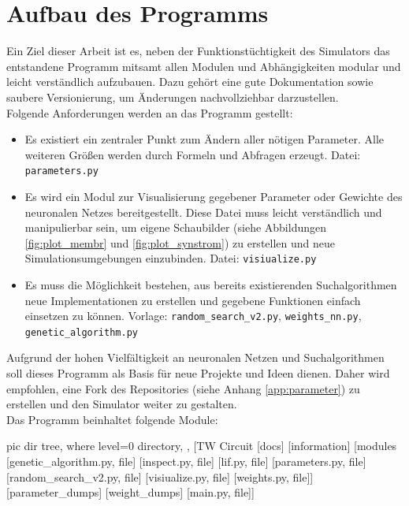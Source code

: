 \section{Aufbau des Programms}
\label{sec:imp_module}
	Ein Ziel dieser Arbeit ist es, neben der Funktionstüchtigkeit des Simulators das entstandene Programm mitsamt allen Modulen und Abhängigkeiten modular und leicht verständlich aufzubauen. Dazu gehört eine gute Dokumentation sowie saubere Versionierung, um Änderungen nachvollziehbar darzustellen.\\
	Folgende Anforderungen werden an das Programm gestellt:
	\begin{itemize}
		\item Es existiert ein zentraler Punkt zum Ändern aller nötigen Parameter. Alle weiteren Größen werden durch Formeln und Abfragen erzeugt.
		\subitem Datei: \texttt{parameters.py}
		\item Es wird ein Modul zur Visualisierung gegebener Parameter oder Gewichte des neuronalen Netzes bereitgestellt. Diese Datei muss leicht verständlich und manipulierbar sein, um eigene Schaubilder (siehe Abbildungen \ref{fig:plot_membr} und \ref{fig:plot_synstrom}) zu erstellen und neue Simulationsumgebungen einzubinden.
		\subitem Datei: \texttt{visiualize.py}
		\item Es muss die Möglichkeit bestehen, aus bereits existierenden Suchalgorithmen neue Implementationen zu erstellen und gegebene Funktionen einfach einsetzen zu können.
		\subitem Vorlage: \texttt{random\_search\_v2.py}, \texttt{weights\_nn.py}, \texttt{genetic\_algorithm.py}
	\end{itemize}
	Aufgrund der hohen Vielfältigkeit an neuronalen Netzen und Suchalgorithmen soll dieses Programm als Basis für neue Projekte und Ideen dienen. Daher wird empfohlen, eine Fork des Repositories (siehe Anhang \ref{app:parameter}) zu erstellen und den Simulator weiter zu gestalten.\\
	Das Programm beinhaltet folgende Module:\\
	\begin{minipage}{0.35\textwidth}
		\vspace{0.3cm}
		\begin{forest}
			pic dir tree,
			where level=0{}{%
				directory,
			},
			[TW Circuit
				[docs]
				[information]
				[modules
					[genetic\_algorithm.py, file]
					[inspect.py, file]
					[lif.py, file]
					[parameters.py, file]
					[random\_search\_v2.py, file]
					[visiualize.py, file]
					[weights.py, file]]
				[parameter\_dumps]
				[weight\_dumps]
				[main.py, file]]
		\end{forest}
	\end{minipage}
